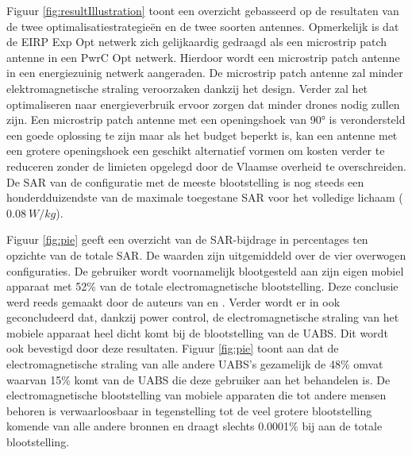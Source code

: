 \documentclass[twocolumn]{phdsymp_dutch}
\begin{document}
Figuur \ref{fig:resultIllustration} toont een overzicht gebasseerd op de resultaten van de twee optimalisatiestrategieën en de twee soorten antennes.
Opmerkelijk is dat de \gls{EIRP} \gls{Exp Opt} netwerk zich gelijkaardig gedraagd als een microstrip patch antenne in een \gls{PwrC Opt} netwerk.
Hierdoor wordt een microstrip patch antenne in een energiezuinig netwerk aangeraden. De microstrip patch antenne zal minder elektromagnetische straling veroorzaken dankzij het design.
Verder zal het optimaliseren naar energieverbruik ervoor zorgen dat minder drones nodig zullen zijn.
Een microstrip patch antenne met een openingshoek van \ang{90} is verondersteld een goede oplossing te zijn
 maar als het budget beperkt is, kan een antenne met een grotere openingshoek een geschikt alternatief vormen
 om kosten verder te reduceren zonder de limieten opgelegd door de Vlaamse overheid te overschreiden.
De \gls{SAR} van de configuratie met de meeste blootstelling is nog steeds een honderdduizendste van de maximale toegestane \gls{SAR} voor het volledige lichaam  ($0.08\ W/kg$).

Figuur \ref{fig:pie} geeft een overzicht van de \gls{SAR}-bijdrage in percentages ten opzichte van de totale \gls{SAR}.
De waarden zijn uitgemiddeld over de vier overwogen configuraties.
De gebruiker wordt voornamelijk blootgesteld aan zijn eigen mobiel apparaat met 
52\% van de totale electromagnetische blootstelling.
Deze conclusie werd reeds gemaakt door de auteurs van 
\cite{J17_kuehn2019modelling} en  \cite{J10.1.1}.
Verder wordt er in \cite{J10.1.1} ook geconcludeerd dat, dankzij power control, 
de electromagnetische straling van het mobiele apparaat heel dicht komt bij de blootstelling van de \gls{UABS}.
Dit wordt ook bevestigd door deze resultaten. Figuur \ref{fig:pie} toont aan dat de electromagnetische straling van 
alle andere \gls{UABS}'s  gezamelijk de 48\% omvat waarvan 15\% komt van de \gls{UABS} die deze gebruiker aan het behandelen is.
De electromagnetische blootstelling van mobiele apparaten die tot andere mensen behoren 
is verwaarloosbaar in tegenstelling tot de veel grotere blootstelling komende van alle andere bronnen
en draagt slechts 0.0001\% bij aan de totale blootstelling.
\end{document}
